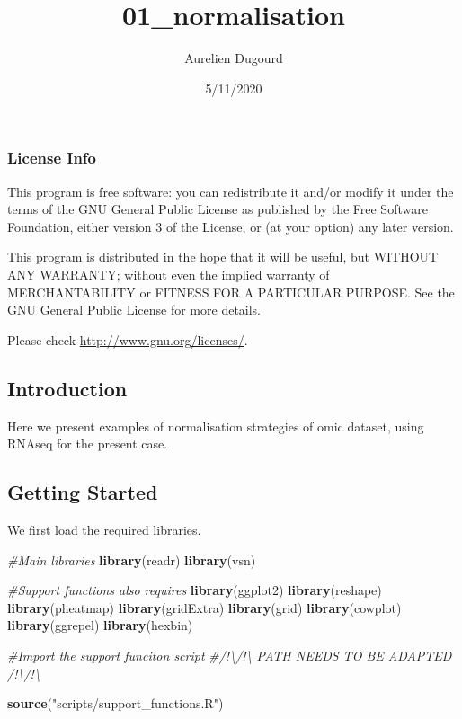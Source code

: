 \documentclass[]{article}
\title{01\_normalisation}
\author{Aurelien Dugourd}
\date{5/11/2020}
\newenvironment{Shaded}{\begin{snugshade}}{\end{snugshade}}
\newcommand{\CommentTok}[1]{\textcolor[rgb]{0.56,0.35,0.01}{\textit{#1}}}
\newcommand{\KeywordTok}[1]{\textcolor[rgb]{0.13,0.29,0.53}{\textbf{#1}}}
\newcommand{\NormalTok}[1]{#1}
\newcommand{\StringTok}[1]{\textcolor[rgb]{0.31,0.60,0.02}{#1}}
\begin{document}
\maketitle

\hypertarget{license-info}{%
\subsubsection{License Info}\label{license-info}}

This program is free software: you can redistribute it and/or modify it
under the terms of the GNU General Public License as published by the
Free Software Foundation, either version 3 of the License, or (at your
option) any later version.

This program is distributed in the hope that it will be useful, but
WITHOUT ANY WARRANTY; without even the implied warranty of
MERCHANTABILITY or FITNESS FOR A PARTICULAR PURPOSE. See the GNU General
Public License for more details.

Please check \url{http://www.gnu.org/licenses/}.

\hypertarget{introduction}{%
\subsection{Introduction}\label{introduction}}

Here we present examples of normalisation strategies of omic dataset,
using RNAseq for the present case.

\hypertarget{getting-started}{%
\subsection{Getting Started}\label{getting-started}}

We first load the required libraries.

\begin{Shaded}
\begin{Highlighting}[]
\CommentTok{#Main libraries}
\KeywordTok{library}\NormalTok{(readr)}
\KeywordTok{library}\NormalTok{(vsn)}

\CommentTok{#Support functions also requires}
\KeywordTok{library}\NormalTok{(ggplot2)}
\KeywordTok{library}\NormalTok{(reshape)}
\KeywordTok{library}\NormalTok{(pheatmap)}
\KeywordTok{library}\NormalTok{(gridExtra)}
\KeywordTok{library}\NormalTok{(grid)}
\KeywordTok{library}\NormalTok{(cowplot)}
\KeywordTok{library}\NormalTok{(ggrepel)}
\KeywordTok{library}\NormalTok{(hexbin)}

\CommentTok{#Import the support funciton script }
\CommentTok{#/!\textbackslash{}/!\textbackslash{} PATH NEEDS TO BE ADAPTED /!\textbackslash{}/!\textbackslash{}}

\KeywordTok{source}\NormalTok{(}\StringTok{"scripts/support_functions.R"}\NormalTok{)}
\end{Highlighting}
\end{Shaded}
\end{document}

